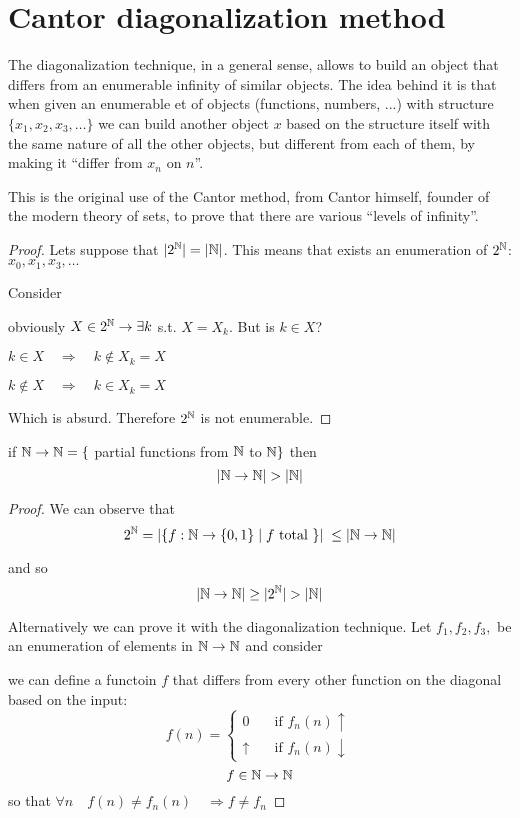 \chapter{Cantor diagonalization method}

The diagonalization technique, in a general sense, allows to build an
object that differs from an enumerable infinity of similar objects.
The idea behind it is that when given an enumerable et of objects
(functions, numbers, ...) with structure $\{x_1, x_2, x_3, \dots \}$
we can build another object $x$ based on the structure itself with the
same nature of all the other objects, but different from each of them,
by making it ``differ from $x_n$ on $n$''.

\begin{example}
  This is the original use of the Cantor method, from Cantor himself,
  founder of the modern theory of sets, to prove that there are
  various ``levels of infinity''.
  \begin{proof}
    Lets suppose that $|2^{\mathbb{N}}| = |\mathbb{N}|$. This means that exists an
    enumeration of $2^{\mathbb{N}}$: $x_0, x_1, x_3, \dots$

    Consider

    obviously $X \in 2^{\mathbb{N}} \rightarrow \exists k$ s.t. $X = X_k$. But
    is $k \in X$?

    \(k \in X \quad \Rightarrow \quad k \notin X_k = X\)
    
    \(k \notin X \quad \Rightarrow \quad k \in X_k = X\)

    Which is absurd. Therefore $2^{\mathbb{N}}$ is not enumerable.
  \end{proof}
\end{example}

\newcommand{\nattonat}{\nat \rightarrow \nat}
\begin{corollary}\label{corollary:nattonat}
  if $\nattonat = \{$ partial functions from $\mathbb{N}$ to $\mathbb{N} \}$
  then \[|\nattonat| > |\nat|\]

  \begin{proof}
    We can observe that
    \[2^\nat = |\{f: \nat \rightarrow \{0,1\} \; | \; f \mbox{ total }
      \} | \; \leq | \nattonat | \]

    and so \[|\nattonat| \geq |2^\nat| > |\nat|\]

    Alternatively we can prove it with the diagonalization
    technique. Let $f_1, f_2, f_3,$ be an enumeration of elements in
    $\nattonat$ and consider


    we can define a functoin $f$ that differs from every other
    function on the diagonal based on the input:
    \[f(n) = \begin{cases}
        0 & \quad \mbox{if } f_n(n)\uparrow \\
        \uparrow & \quad \mbox{if } f_n(n) \downarrow
      \end{cases}
    \] \[f \in \nattonat\] so that
    $\forall n \quad f(n) \neq f_n(n) \quad \Rightarrow f \neq f_n$
  \end{proof}
\end{corollary}

